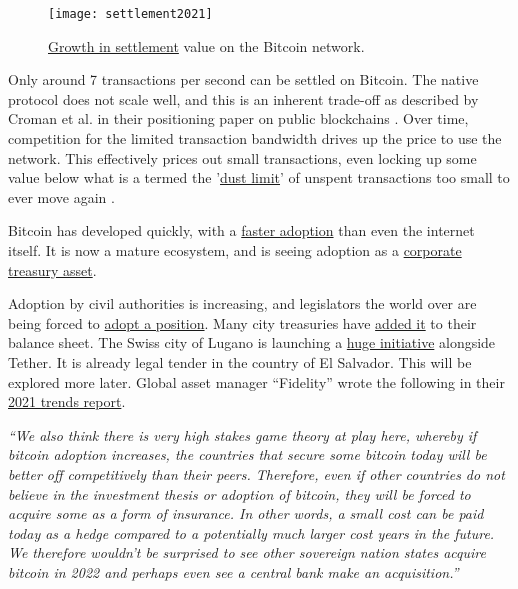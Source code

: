 \begin{figure}
  \centering
    \texttt{[image: settlement2021]}
  \caption{\href{https://twitter.com/glxyresearch/status/1469039427028664320?}{Growth in settlement} value on the Bitcoin network.}
  \label{fig:settled2021}
\end{figure}
Only around 7 transactions per second can be settled on Bitcoin. The native protocol does not scale well, and this is an inherent trade-off as described by Croman et al. in their positioning paper on public blockchains \cite{croman2016scaling}. Over time, competition for the limited transaction bandwidth drives up the price to use the network. This effectively prices out small transactions, even locking up some value below what is a termed the '\href{https://github.com/bitcoin/bitcoin/blob/v0.10.0rc3/src/primitives/transaction.h#L137}{dust limit}' of unspent transactions too small to ever move again \cite{delgado2018analysis}. \par
Bitcoin has developed quickly, with a \href{https://phemex.com/blogs/crypto-bitcoin-s-curve-adoption-curve}{faster adoption} than even the internet itself. It is now a mature ecosystem, and is seeing adoption as a \href{https://bitcointreasuries.net/}{corporate treasury asset}. \par
Adoption by civil authorities is increasing, and legislators the world over are being forced to \href{https://www.politico.com/news/2022/01/16/bitcoin-crashes-the-midterms-527126}{adopt a position}. Many city treasuries have \href{https://www.bloomberg.com/news/articles/2022-01-14/rio-de-janeiro-wants-to-become-brazil-s-cryptocurrency-capital}{added it} to their balance sheet. The Swiss city of Lugano is launching a \href{https://twitter.com/Stadicus3000/status/1499656424422526977}{huge initiative} alongside Tether. It is already legal tender in the country of El Salvador\cite{oxford2021salvador}. This will be explored more later. Global asset manager ``Fidelity'' wrote the following in their \href{https://www.fidelitydigitalassets.com/articles/2021-trends-impact}{2021 trends report}.\par
\textit{``We also think there is very high stakes game theory at play here, whereby if bitcoin adoption increases, the countries that secure some bitcoin today will be better off competitively than their peers. Therefore, even if other countries do not believe in the investment thesis or adoption of bitcoin, they will be forced to acquire some as a form of insurance. In other words, a small cost can be paid today as a hedge compared to a potentially much larger cost years in the future. We therefore wouldn't be surprised to see other sovereign nation states acquire bitcoin in 2022 and perhaps even see a central bank make an acquisition.''}\par
